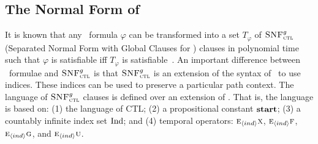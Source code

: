 \documentclass{article}
\begin{document}
\subsection{The Normal Form of \CTL}
It is  known that any \CTL\ formula $\varphi$ can be transformed into a set $T_\varphi$ of ${\textsc{SNF}_{\textsc{ctl}}^g}$ (Separated Normal Form with Global Clauses for \CTL) clauses in polynomial time such that $\varphi$ is satisfiable iff $T_\varphi$ is satisfiable~\cite{zhang2008first}.
An important difference between \CTL\ formulae and ${\textsc{SNF}_{\textsc{ctl}}^g}$ is that ${\textsc{SNF}_{\textsc{ctl}}^g}$ is an extension of the syntax of \CTL\ to use indices. These indices can be used to preserve a particular path context. The language of ${\textsc{SNF}_{\textsc{ctl}}^g}$ clauses is defined over an extension of \CTL. That is, the language is based on: (1) the language of CTL; (2) a propositional constant $\textbf{start}$; (3) a countably infinite index set $\textrm{Ind}$; and (4) temporal operators: $\textsc{e}_{{\langle{ind}\rangle}} \textsc{x}$, $\textsc{e}_{{\langle{ind}\rangle}} \textsc{f}$, $\textsc{e}_{{\langle{ind}\rangle}} \textsc{g}$, and $\textsc{e}_{{\langle{ind}\rangle}} \textsc{u}$. %

\end{document}
